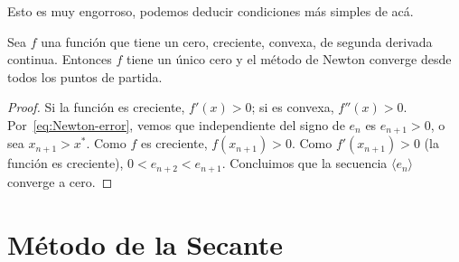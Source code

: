   Esto es muy engorroso,
  podemos deducir condiciones más simples de acá.
  \begin{corollary}
    \label{cor:Newton-convergence-simple}
    Sea \(f\) una función que tiene un cero,
    creciente,
    convexa,
    de segunda derivada continua.
    Entonces \(f\) tiene un único cero
    y el método de Newton converge desde todos los puntos de partida.
  \end{corollary}
  \begin{proof}
    Si la función es creciente,
    \(f'(x) > 0\);
    si es convexa,
    \(f''(x) > 0\).
    Por~\eqref{eq:Newton-error},
    vemos que independiente del signo de \(e_n\) es \(e_{n + 1} > 0\),
    o sea \(x_{n + 1} > x^*\).
    Como \(f\) es creciente,
    \(f(x_{n + 1}) > 0\).
    Como \(f'(x_{n + 1}) > 0\)
    (la función es creciente),
    \(0 < e_{n + 2} < e_{n + 1}\).
    Concluimos que la secuencia \(\langle e_n \rangle\) converge a cero.
  \end{proof}

\section{Método de la Secante}

